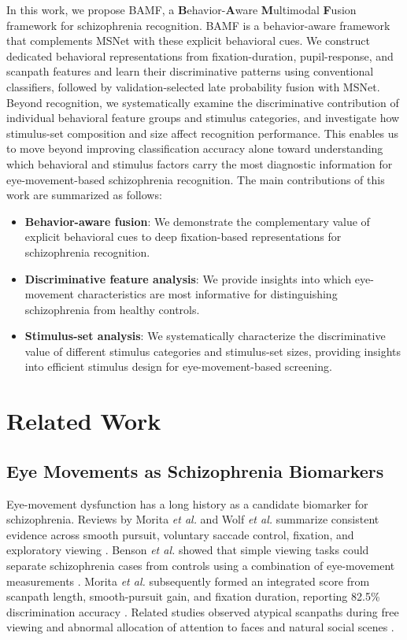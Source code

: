 \documentclass[conference,a4paper]{IEEEtran}
\begin{document}
In this work, we propose BAMF, a \textbf{B}ehavior-\textbf{A}ware \textbf{M}ultimodal \textbf{F}usion framework for schizophrenia recognition. BAMF is a behavior-aware framework that complements MSNet with these explicit behavioral cues. We construct dedicated behavioral representations from fixation-duration, pupil-response, and scanpath features and learn their discriminative patterns using conventional classifiers, followed by validation-selected late probability fusion with MSNet. Beyond recognition, we systematically examine the discriminative contribution of individual behavioral feature groups and stimulus categories, and investigate how stimulus-set composition and size affect recognition performance. This enables us to move beyond improving classification accuracy alone toward understanding which behavioral and stimulus factors carry the most diagnostic information for eye-movement-based schizophrenia recognition. The main contributions of this work are summarized as follows:
\begin{itemize}
    \item \textbf{Behavior-aware fusion}: We demonstrate the complementary value of explicit behavioral cues to deep fixation-based representations for schizophrenia recognition.
    \item \textbf{Discriminative feature analysis}: We provide insights into which eye-movement characteristics are most informative for distinguishing schizophrenia from healthy controls.
    \item \textbf{Stimulus-set analysis}: We systematically characterize the discriminative value of different stimulus categories and stimulus-set sizes, providing insights into efficient stimulus design for eye-movement-based screening.
\end{itemize}

\section{Related Work}
\subsection{Eye Movements as Schizophrenia Biomarkers}
Eye-movement dysfunction has a long history as a candidate biomarker for schizophrenia. Reviews by Morita \emph{et al.} and Wolf \emph{et al.} summarize consistent evidence across smooth pursuit, voluntary saccade control, fixation, and exploratory viewing \cite{morita2020characteristics,wolf2021review}. Benson \emph{et al.} showed that simple viewing tasks could separate schizophrenia cases from controls using a combination of eye-movement measurements \cite{benson2012simple}. Morita \emph{et al.} subsequently formed an integrated score from scanpath length, smooth-pursuit gain, and fixation duration, reporting 82.5\% discrimination accuracy \cite{morita2017integrated}. Related studies observed atypical scanpaths during free viewing and abnormal allocation of attention to faces and natural social scenes \cite{patel2020social}.
\end{document}
